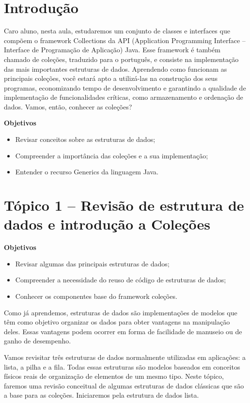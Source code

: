 \documentclass[11pt]{article}
\author{Diogo}
\date{\today}
\title{}
\begin{document}
\tableofcontents

\section{Introdução}
\label{sec:org5cf5c8b}
Caro aluno, nesta aula, estudaremos um conjunto de classes e interfaces que compõem o framework Collections da API (Application Programming Interface – Interface de Programação de Aplicação) Java. Esse framework é também chamado de coleções, traduzido para o português, e consiste na implementação das mais importantes estruturas de dados. Aprendendo como funcionam as principais coleções, você estará apto a utilizá-las na construção dos seus programas, economizando tempo de desenvolvimento e garantindo a qualidade de implementação de funcionalidades críticas, como armazenamento e ordenação de dados. Vamos, então, conhecer as coleções?

\textbf{Objetivos}
\begin{itemize}
\item Revisar conceitos sobre as estruturas de dados;
\item Compreender a importância das coleções e a sua implementação;
\item Entender o recurso Generics da linguagem Java.
\end{itemize}

\section{Tópico 1 – Revisão de estrutura de dados e introdução a Coleções}
\label{sec:orgcb00943}
\textbf{Objetivos}
\begin{itemize}
\item Revisar algumas das principais estruturas de dados;
\item Compreender a necessidade do reuso de código de estruturas de dados;
\item Conhecer os componentes base do framework coleções.
\end{itemize}

Como já aprendemos, estruturas de dados são implementações de modelos que têm como objetivo organizar os dados para obter vantagens na manipulação deles. Essas vantagens podem ocorrer em forma de facilidade de manuseio ou de ganho de desempenho.

Vamos revisitar três estruturas de dados normalmente utilizadas em aplicações: a lista, a pilha e a fila. Todas essas estruturas são modelos baseados em conceitos físicos reais de organização de elementos de um mesmo tipo. Neste tópico, faremos uma revisão conceitual de algumas estruturas de dados clássicas que são a base para as coleções. Iniciaremos pela estrutura de dados lista.
\end{document}
